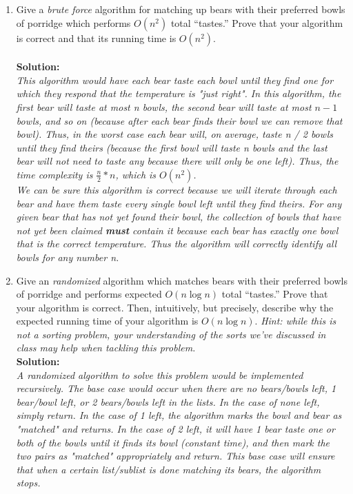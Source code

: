 \documentclass[10pt]{article}
\begin{document}
\begin{enumerate}
    \item Give a {\em brute force} algorithm for matching up bears with their preferred bowls of porridge which performs $O(n^2)$ total ``tastes.'' Prove that your algorithm is correct and that its running time is $O(n^2)$. \\ \\
    \textbf{Solution:} \\
    \emph{
        This algorithm would have each bear taste each bowl until they find one for which they respond that the temperature is "just right". In this algorithm, the first bear will taste at most n bowls, the second bear will taste at most $n - 1$ bowls, and so on (because after each bear finds their bowl we can remove that bowl). Thus, in the worst case each bear will, on average, taste n / 2 bowls until they find theirs (because the first bowl will taste n bowls and the last bear will not need to taste any because there will only be one left). Thus, the time complexity is $\frac{n}{2} * n$, which is $O(n^2)$. \\
        We can be sure this algorithm is correct because we will iterate through each bear and have them taste every single bowl left until they find theirs. For any given bear that has not yet found their bowl, the collection of bowls that have not yet been claimed \textbf{must} contain it because each bear has exactly one bowl that is the correct temperature. Thus the algorithm will correctly identify all bowls for any number n.
    }
    \item Give an {\em randomized} algorithm which matches bears with their preferred bowls of porridge and performs expected $O(n \log n)$ total ``tastes.'' Prove that your algorithm is correct. Then, intuitively, but precisely, describe why the expected running time of your algorithm is $O(n \log n)$. {\em Hint: while this is not a sorting problem, your understanding of the sorts we've discussed in class may help when tackling this problem.} \\
    \textbf{Solution:} \\
    \emph{
    A randomized algorithm to solve this problem would be implemented recursively. The base case would occur when there are no bears/bowls left, 1 bear/bowl left, or 2 bears/bowls left in the lists. In the case of none left, simply return. In the case of 1 left, the algorithm marks the bowl and bear as "matched" and returns. In the case of 2 left, it will have 1 bear taste one or both of the bowls until it finds its bowl (constant time), and then mark the two pairs as "matched" appropriately and return. This base case will ensure that when a certain list/sublist is done matching its bears, the algorithm stops. \\
}
\end{enumerate}
\end{document}
